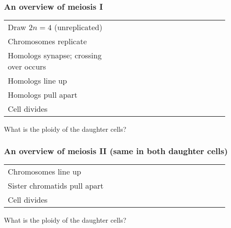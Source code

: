 \begin{frame}[t]
    \frametitle{An overview of meiosis I}
    \begin{adjustwidth}{-3em}{-3em}

        \vspace{-3mm}
    \begin{table}%
        \centering
        \begin{tabular}{ p{0.45\linewidth} p{0.45\linewidth} }
            Draw $2n=4$ (unreplicated) & \\[5ex]
            Chromosomes replicate & \\[5ex]
            {\small Homologs synapse; crossing over occurs} & \\[5ex]
            Homologs line up & \\[5ex]
            Homologs pull apart & \\[5ex]
            Cell divides & \\
        \end{tabular}
    \end{table}
    \end{adjustwidth}
    \vspace{3mm}
    What is the ploidy of the daughter cells? 
\end{frame}

\begin{frame}[t]
    \frametitle{An overview of meiosis II (same in both daughter cells)}
    \begin{adjustwidth}{-3em}{-3em}

        \vspace{-1mm}
    \begin{table}%
        \centering
        \begin{tabular}{ p{0.45\linewidth} p{0.45\linewidth} }
            Chromosomes line up & \\[12ex]
            Sister chromatids pull apart & \\[12ex]
            Cell divides & \\
        \end{tabular}
    \end{table}
    \end{adjustwidth}
    \vspace{1.5cm}
    What is the ploidy of the daughter cells? 
\end{frame}

